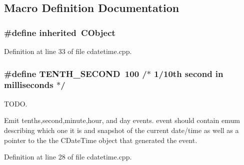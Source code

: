 \subsection{Macro Definition Documentation}
\subsubsection[{inherited}]{\setlength{\rightskip}{0pt plus 5cm}\#define inherited~C\+Object}\label{cdatetime_8cpp_a3920e3b7cb0909b941b2409493acf8f1}


Definition at line 33 of file cdatetime.\+cpp.

\subsubsection[{T\+E\+N\+T\+H\+\_\+\+S\+E\+C\+O\+ND}]{\setlength{\rightskip}{0pt plus 5cm}\#define T\+E\+N\+T\+H\+\_\+\+S\+E\+C\+O\+ND~100  /$\ast$ 1/10th second in milliseconds $\ast$/}\label{cdatetime_8cpp_a55ec6f6ba7f58ec046c46095a7f09133}


T\+O\+DO. 


\begin{DoxyItemize}
\item Emit tenths,second,minute,hour, and day events. event should contain emum describing which one it is and snapshot of the current date/time as well as a pointer to the the C\+Date\+Time object that generated the event. 
\end{DoxyItemize}

Definition at line 28 of file cdatetime.\+cpp.

